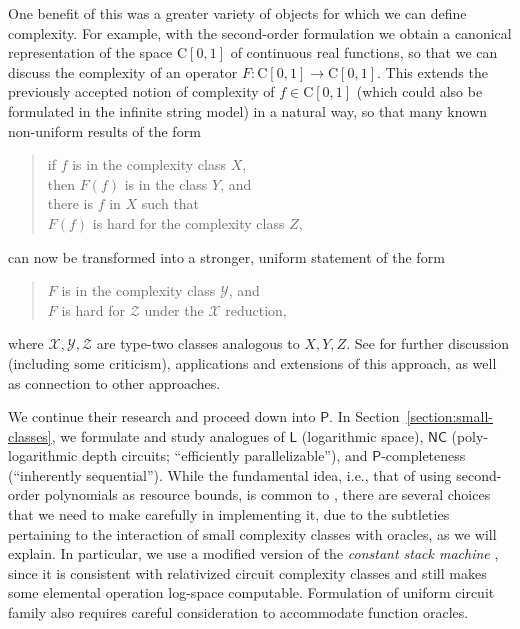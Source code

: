 \documentclass[envcountsect,envcountsame,orivec,oribibl]{llncs}
\newcommand{\classonefont}[1]{\mathsf{#1}}
\newcommand{\classL}{\classonefont{L}}
\newcommand{\classP}{\classonefont{P}}
\newcommand{\classNC}{\classonefont{NC}}
\newcommand{\classC}{\mathrm C}
\begin{document}
One benefit of this was
a greater variety of objects for which we can define complexity. 
For example, with the second-order formulation
we obtain a canonical representation of the space $\classC [0, 1]$
of continuous real functions, 
so that we can discuss the complexity of an
operator $F \colon \classC [0, 1] \to \classC [0, 1]$. 
This extends the previously accepted notion of 
complexity of $f \in \classC [0, 1]$
(which could also be formulated in the infinite string model)
in a natural way, so that many known non-uniform results of the form
\begin{quote}
 if $f$ is in the complexity class $X$, \\
 \mbox{}\qquad then $F(f)$ is in the class $Y$, and \\
 there is $f$ in $X$ such that \\ 
 \mbox{}\qquad $F(f)$ is hard for the complexity class $Z$, 
\end{quote}
can now be transformed into a stronger, uniform statement of the form
\begin{quote}
 $F$ is in the complexity class $\mathcal Y$, and \\
 $F$ is hard for $\mathcal Z$ under the $\mathcal X$ reduction,
\end{quote}
where $\mathcal{X, Y, Z}$ are type-two classes analogous to ${X, Y, Z}$.
See \cite{ambos-spies,feree,rettinger,roesnick,ziegler} for further discussion 
(including some criticism), 
applications and extensions of this approach, 
as well as connection to other approaches. 

We continue their research and proceed down into $\classP$. 
In Section~\ref{section:small-classes}, 
we formulate and study analogues of 
$\classL$ (logarithmic space), 
$\classNC$ (poly-logarithmic depth circuits; ``efficiently parallelizable''), 
and 
$\classP$-completeness (``inherently sequential''). 
While the fundamental idea, 
i.e., that of using second-order polynomials as resource bounds, 
is common to \cite{kawamura2012complexity}, 
there are several choices that we need to make carefully
in implementing it, 
due to the subtleties pertaining to 
the interaction of small complexity classes with oracles, 
as we will explain. 
In particular, 
we use a modified version of 
the \emph{constant stack machine} \cite{aehlig2007relativizing}, 
since it is consistent with relativized circuit complexity classes 
and still makes some elemental operation log-space computable.
Formulation of uniform circuit family
also requires careful consideration to 
accommodate function oracles. 
\end{document}
